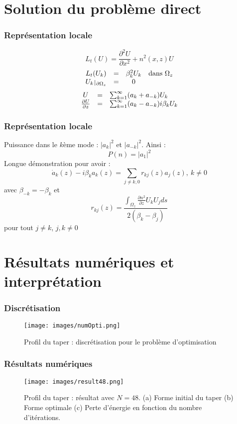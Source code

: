\documentclass[handout, aspectratio=169]{beamer}
\def\restriction#1#2{\mathchoice
              {\setbox1\hbox{${\displaystyle #1}_{\scriptstyle #2}$}
              \restrictionaux{#1}{#2}}
              {\setbox1\hbox{${\textstyle #1}_{\scriptstyle #2}$}
              \restrictionaux{#1}{#2}}
              {\setbox1\hbox{${\scriptstyle #1}_{\scriptscriptstyle #2}$}
              \restrictionaux{#1}{#2}}
              {\setbox1\hbox{${\scriptscriptstyle #1}_{\scriptscriptstyle #2}$}
              \restrictionaux{#1}{#2}}}
\def\restrictionaux#1#2{{#1\,\smash{\vrule height .8\ht1 depth .85\dp1}}_{\,#2}}
\begin{document}
\section{Solution du problème direct}
\begin{frame}
	\frametitle{Représentation locale}
\[L_t(U)=\frac{\partial^2U}{\partial x^2}+n^2(x,z)U\]
\begin{equation} \label{eq13}
	\begin{array}{c c c c}
		L_t(U_k)&=&\beta_k^2U_k &\text{dans } \Omega_z\\
		\restriction{U_k}{\partial\Omega_z}&=&0
	\end{array}
\end{equation}
\begin{equation}\label{eq14}
\begin{array}{c c l}
U&=&\sum_{k=1}^\infty (a_k+a_{-k})U_k\\
\frac{\partial U}{\partial z}&=&\sum_{k=1}^\infty (a_k-a_{-k})i\beta_kU_k
\end{array}
\end{equation}
\end{frame}

\begin{frame}
	\frametitle{Représentation locale}
Puissance dans le $k$ème mode : $|a_k|^2$ et $|a_{-k}|^2$. Ainsi :
\[P(n)=|a_1|^2\]
Longue démonstration pour avoir :
\begin{equation} \label{eq17}
\dot{a}_k(z)-i\beta_ka_k(z)=\sum_{j\neq k,0} r_{kj}(z)a_j(z),\ k\neq 0
\end{equation}
avec $\beta_{-k}=-\beta_k$ et \[r_{kj}(z)=\frac{\int_{\Omega_z} \frac{\partial n^2}{\partial z} U_kU_j ds}{2(\beta_k-\beta_j)}\]
pour tout $j\neq k$, $j,k\neq 0$\\
\end{frame}

\section{Résultats numériques et interprétation}
\begin{frame}
	\frametitle{Discrétisation}
\begin{figure}[!h]
	\centering
	\texttt{[image: images/numOpti.png]}
	\caption{Profil du taper : discrétisation pour le problème d'optimisation}
	\label{fig:numOpti}
\end{figure}
\end{frame}

\begin{frame}
	\frametitle{Résultats numériques}
\begin{figure}[!h]
	\centering
	\texttt{[image: images/result48.png]}
	\caption{Profil du taper : résultat avec $N=48$. (a) Forme initial du taper (b) Forme optimale (c) Perte d'énergie en fonction du nombre d'itérations.}
	\label{fig:result48}
\end{figure}
\end{frame}
\end{document}
